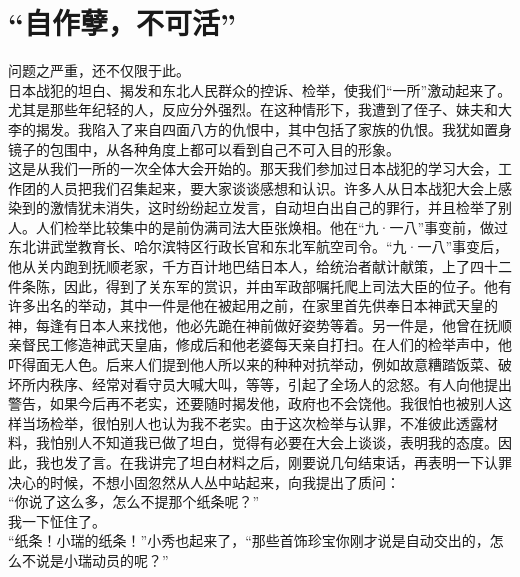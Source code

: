 \fancyhead[RO]{} %
\fancyhead[LE]{} %
\chapter*{“自作孽，不可活”}
\thispagestyle{empty}
问题之严重，还不仅限于此。\\

日本战犯的坦白、揭发和东北人民群众的控诉、检举，使我们“一所”激动起来了。尤其是那些年纪轻的人，反应分外强烈。在这种情形下，我遭到了侄子、妹夫和大李的揭发。我陷入了来自四面八方的仇恨中，其中包括了家族的仇恨。我犹如置身镜子的包围中，从各种角度上都可以看到自己不可入目的形象。\\

这是从我们一所的一次全体大会开始的。那天我们参加过日本战犯的学习大会，工作团的人员把我们召集起来，要大家谈谈感想和认识。许多人从日本战犯大会上感染到的激情犹未消失，这时纷纷起立发言，自动坦白出自己的罪行，并且检举了别人。人们检举比较集中的是前伪满司法大臣张焕相。他在“九·一八”事变前，做过东北讲武堂教育长、哈尔滨特区行政长官和东北军航空司令。“九·一八”事变后，他从关内跑到抚顺老家，千方百计地巴结日本人，给统治者献计献策，上了四十二件条陈，因此，得到了关东军的赏识，并由军政部嘱托爬上司法大臣的位子。他有许多出名的举动，其中一件是他在被起用之前，在家里首先供奉日本神武天皇的神，每逢有日本人来找他，他必先跪在神前做好姿势等着。另一件是，他曾在抚顺亲督民工修造神武天皇庙，修成后和他老婆每天亲自打扫。在人们的检举声中，他吓得面无人色。后来人们提到他人所以来的种种对抗举动，例如故意糟踏饭菜、破坏所内秩序、经常对看守员大喊大叫，等等，引起了全场人的忿怒。有人向他提出警告，如果今后再不老实，还要随时揭发他，政府也不会饶他。我很怕也被别人这样当场检举，很怕别人也认为我不老实。由于这次检举与认罪，不准彼此透露材料，我怕别人不知道我已做了坦白，觉得有必要在大会上谈谈，表明我的态度。因此，我也发了言。在我讲完了坦白材料之后，刚要说几句结束话，再表明一下认罪决心的时候，不想小固忽然从人丛中站起来，向我提出了质问：\\

“你说了这么多，怎么不提那个纸条呢？”\\

我一下怔住了。\\

“纸条！小瑞的纸条！”小秀也起来了，“那些首饰珍宝你刚才说是自动交出的，怎么不说是小瑞动员的呢？”\\

